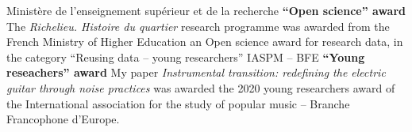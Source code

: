 	{%
		Ministère de l'enseignement supérieur et de la recherche}
	{%
		\textbf{\enquote{Open science} award}}
	{%
		The \textit{Richelieu. Histoire du quartier} research programme was awarded from the French Ministry of Higher Education an Open science award for research data, in the category \enquote{Reusing data -- young researchers}}
	{%
		IASPM -- BFE}
	{%
		\textbf{\enquote{Young reseachers} award}}
	{%
		My paper \textit{Instrumental transition: redefining the electric guitar through noise practices} was awarded the 2020 young researchers award of the International association for the study of popular music -- Branche Francophone d'Europe.}


